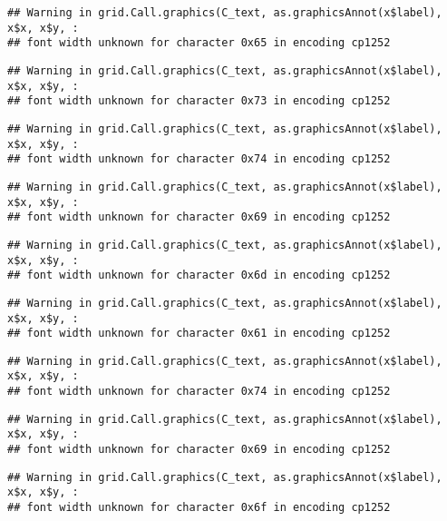 \documentclass[
]{article}
\begin{document}
\begin{verbatim}
## Warning in grid.Call.graphics(C_text, as.graphicsAnnot(x$label), x$x, x$y, :
## font width unknown for character 0x65 in encoding cp1252
\end{verbatim}

\begin{verbatim}
## Warning in grid.Call.graphics(C_text, as.graphicsAnnot(x$label), x$x, x$y, :
## font width unknown for character 0x73 in encoding cp1252
\end{verbatim}

\begin{verbatim}
## Warning in grid.Call.graphics(C_text, as.graphicsAnnot(x$label), x$x, x$y, :
## font width unknown for character 0x74 in encoding cp1252
\end{verbatim}

\begin{verbatim}
## Warning in grid.Call.graphics(C_text, as.graphicsAnnot(x$label), x$x, x$y, :
## font width unknown for character 0x69 in encoding cp1252
\end{verbatim}

\begin{verbatim}
## Warning in grid.Call.graphics(C_text, as.graphicsAnnot(x$label), x$x, x$y, :
## font width unknown for character 0x6d in encoding cp1252
\end{verbatim}

\begin{verbatim}
## Warning in grid.Call.graphics(C_text, as.graphicsAnnot(x$label), x$x, x$y, :
## font width unknown for character 0x61 in encoding cp1252
\end{verbatim}

\begin{verbatim}
## Warning in grid.Call.graphics(C_text, as.graphicsAnnot(x$label), x$x, x$y, :
## font width unknown for character 0x74 in encoding cp1252
\end{verbatim}

\begin{verbatim}
## Warning in grid.Call.graphics(C_text, as.graphicsAnnot(x$label), x$x, x$y, :
## font width unknown for character 0x69 in encoding cp1252
\end{verbatim}

\begin{verbatim}
## Warning in grid.Call.graphics(C_text, as.graphicsAnnot(x$label), x$x, x$y, :
## font width unknown for character 0x6f in encoding cp1252
\end{verbatim}
\end{document}
